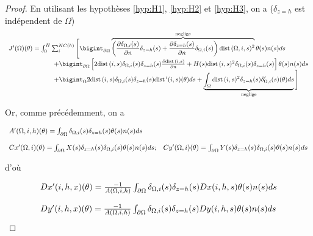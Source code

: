 \documentclass[11pt,a4paper]{article}
\begin{document}
\begin{proof}
	En utilisant les hypothèses \ref{hyp:H1}, \ref{hyp:H2} et \ref{hyp:H3}, on a ($\delta_{z=h}$ est indépendent de $\Omega$)
	\begin{equation}
	\begin{array}{l}
	J'(\Omega)(\theta)=\int_0^H\sum_{i}^{NC(h)}\Bigg[ 	\bigintpO \overbrace{\left(\frac{\partial \delta_{\Omega,i}(s)}{\partial n}\delta_{z=h}(s)+\frac{\partial \delta_{z=h}(s)}{\partial n}\delta_{\Omega,i}(s)\right)\dist(\Omega,i,s)^2}^\text{\textrm{neglige}}\theta(s)n(s)ds \\
	\qquad \qquad \qquad \quad +\bigintpO \left[2\dist(i,s)\delta_{\Omega,i}(s)\delta_{z=h}(s)\frac{\partial\dist(i,s)}{\partial n}+H(s)\dist(i,s)^2\delta_{\Omega,i}(s)\delta_{z=h}(s)\right]\theta(s)n(s)ds\\
	\qquad \qquad \qquad \quad +\bigintO 2\dist(i,s)\delta_{\Omega,i}(s)\delta_{z=h}(s)\dist '(i,s)(\theta)ds+\underbrace{\intO \dist(i,s)^2\delta_{z=h}(s)\delta_{\Omega,i}'(s)(\theta)ds}_\text{\textrm{neglige}}\Bigg]\\
	\end{array}
	\end{equation}
	
	Or, comme précédemment, on a 
	
	\begin{equation}
	\begin{array}{ll}
	A'(\Omega,i,h)(\theta)= \int_{\partial\Omega} \delta_{\Omega,i}(s)\delta_{z=h}(s)\theta(s)n(s)ds &\, \\
	\\
	Cx'(\Omega,i)(\theta)=\int_{\partial\Omega} X(s)\delta_{z=h}(s)\delta_{\Omega,i}(s)\theta(s)n(s)ds; & Cy'(\Omega,i)(\theta)= \int_{\partial\Omega} Y(s)\delta_{z=h}(s)\delta_{\Omega,i}(s)\theta(s)n(s)ds\\
	\end{array}
	\end{equation}
	
	d'où
	
	\begin{equation}
	\begin{array}{l}
	Dx'(i,h,x)(\theta)=\frac{-1}{A(\Omega,i,h)}\int_{\partial\Omega}\delta_{\Omega,i}(s)\delta_{z=h}(s)Dx(i,h,s)\theta(s)n(s)ds\\
	\\
	Dy'(i,h,x)(\theta)=\frac{-1}{A(\Omega,i,h)}\int_{\partial\Omega}\delta_{\Omega,i}(s)\delta_{z=h}(s)Dy(i,h,s)\theta(s)n(s)ds\\
	\end{array}
	\end{equation}
	

\end{proof}
\end{document}
